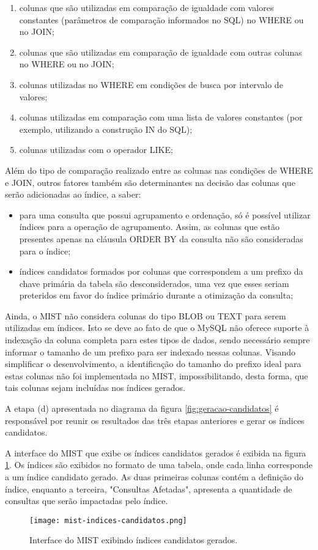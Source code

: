 \begin{enumerate}
    \item colunas que são utilizadas em comparação de igualdade com valores constantes (parâmetros de comparação informados no SQL) no WHERE ou no JOIN;
    \item colunas que são utilizadas em comparação de igualdade com outras colunas no WHERE ou no JOIN;
    \item colunas utilizadas no WHERE em condições de busca por intervalo de valores;
    \item colunas utilizadas em comparação com uma lista de valores constantes (por exemplo, utilizando a construção IN do SQL);
    \item colunas utilizadas com o operador LIKE;
\end{enumerate}

Além do tipo de comparação realizado entre as colunas nas condições de WHERE e JOIN, outros fatores também são determinantes na decisão das colunas que serão adicionadas ao índice, a saber:

\begin{itemize}
    \item para uma consulta que possui agrupamento e ordenação, só é possível utilizar índices para a operação de agrupamento. Assim, as colunas que estão presentes apenas na cláusula ORDER BY da consulta não são consideradas para o índice;
    \item índices candidatos formados por colunas que correspondem a um prefixo da chave primária da tabela são desconsiderados, uma vez que esses seriam preteridos em favor do índice primário durante a otimização da consulta;
\end{itemize}

Ainda, o MIST não considera colunas do tipo BLOB ou TEXT para serem utilizadas em índices. Isto se deve ao fato de que o MySQL não oferece suporte à indexação da coluna completa para estes tipos de dados, sendo necessário sempre informar o tamanho de um prefixo para ser indexado nessas colunas. Visando simplificar o desenvolvimento, a identificação do tamanho do prefixo ideal para estas colunas não foi implementada no MIST, impossibilitando, desta forma, que tais colunas sejam incluídas nos índices gerados.

A etapa (d) apresentada no diagrama da figura \ref{fig:geracao-candidatos} é responsável por reunir os resultados das três etapas anteriores e gerar os índices candidatos.

A interface do MIST que exibe os índices candidatos gerados é exibida na figura \ref{fig:mist-candidatos-gerados}. Os índices são exibidos no formato de uma tabela, onde cada linha corresponde a um índice candidato gerado. As duas primeiras colunas contém a definição do índice, enquanto a terceira, "Consultas Afetadas", apresenta a quantidade de consultas que serão impactadas pelo índice.


\begin{figure}[!ht]
  \centering
  \caption{Interface do MIST exibindo índices candidatos gerados.}
  \texttt{[image: mist-indices-candidatos.png]}
  \label{fig:mist-candidatos-gerados}
\end{figure}
